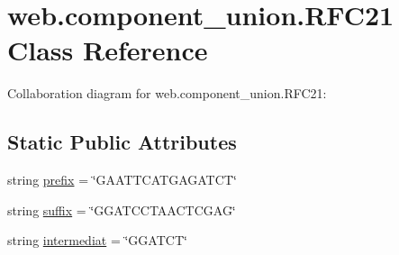 \hypertarget{classweb_1_1component__union_1_1_r_f_c21}{\section{web.\-component\-\_\-union.\-R\-F\-C21 Class Reference}
\label{classweb_1_1component__union_1_1_r_f_c21}
}


Collaboration diagram for web.\-component\-\_\-union.\-R\-F\-C21\-:
\subsection*{Static Public Attributes}
\begin{DoxyCompactItemize}
\item 
string \hyperlink{classweb_1_1component__union_1_1_r_f_c21_ad8cf78991352d8d2df4462d4911b0f08}{prefix} = \char`\"{}G\-A\-A\-T\-T\-C\-A\-T\-G\-A\-G\-A\-T\-C\-T\char`\"{}
\item 
string \hyperlink{classweb_1_1component__union_1_1_r_f_c21_a17f59e8a9402a61bbe4e1943c74068fc}{suffix} = \char`\"{}G\-G\-A\-T\-C\-C\-T\-A\-A\-C\-T\-C\-G\-A\-G\char`\"{}
\item 
string \hyperlink{classweb_1_1component__union_1_1_r_f_c21_a64e75fe85791a49cae4b9daec3e0b61c}{intermediat} = \char`\"{}G\-G\-A\-T\-C\-T\char`\"{}
\end{DoxyCompactItemize}


